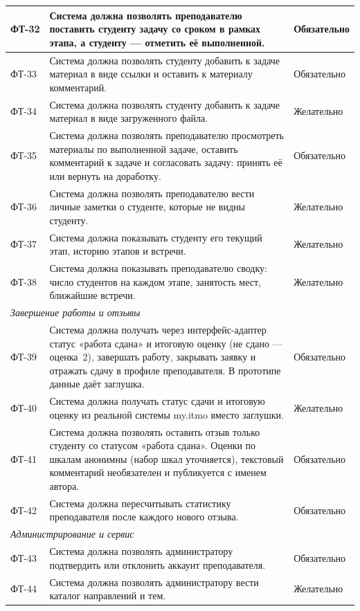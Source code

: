 \documentclass[a4paper,12pt]{article}
\begin{document}
{\begin{longtable}{|p{1.3cm}|p{11.1cm}|p{2.3cm}|}
ФТ-32 & Система должна позволять преподавателю поставить студенту задачу со сроком в рамках этапа, а студенту — отметить её выполненной. & Обязательно\\ \hline
ФТ-33 & Система должна позволять студенту добавить к задаче материал в виде ссылки и оставить к материалу комментарий. & Обязательно\\ \hline
ФТ-34 & Система должна позволять студенту добавить к задаче материал в виде загруженного файла. & Желательно\\ \hline
ФТ-35 & Система должна позволять преподавателю просмотреть материалы по выполненной задаче, оставить комментарий к задаче и согласовать задачу: принять её или вернуть на доработку. & Обязательно\\ \hline
ФТ-36 & Система должна позволять преподавателю вести личные заметки о студенте, которые не видны студенту. & Желательно\\ \hline
ФТ-37 & Система должна показывать студенту его текущий этап, историю этапов и встречи. & Желательно\\ \hline
ФТ-38 & Система должна показывать преподавателю сводку: число студентов на каждом этапе, занятость мест, ближайшие встречи. & Желательно\\ \hline
\multicolumn{3}{|l|}{\textit{Завершение работы и отзывы}}\\ \hline
ФТ-39 & Система должна получать через интерфейс-адаптер статус «работа сдана» и итоговую оценку (не сдано — оценка~2), завершать работу, закрывать заявку и отражать сдачу в профиле преподавателя. В прототипе данные даёт заглушка. & Обязательно\\ \hline
ФТ-40 & Система должна получать статус сдачи и итоговую оценку из реальной системы my.itmo вместо заглушки. & Желательно\\ \hline
ФТ-41 & Система должна позволять оставить отзыв только студенту со статусом «работа сдана». Оценки по шкалам анонимны (набор шкал уточняется), текстовый комментарий необязателен и публикуется с именем автора. & Обязательно\\ \hline
ФТ-42 & Система должна пересчитывать статистику преподавателя после каждого нового отзыва. & Обязательно\\ \hline
\multicolumn{3}{|l|}{\textit{Администрирование и сервис}}\\ \hline
ФТ-43 & Система должна позволять администратору подтвердить или отклонить аккаунт преподавателя. & Обязательно\\ \hline
ФТ-44 & Система должна позволять администратору вести каталог направлений и тем. & Желательно\\ \hline

\end{longtable}}
\end{document}
